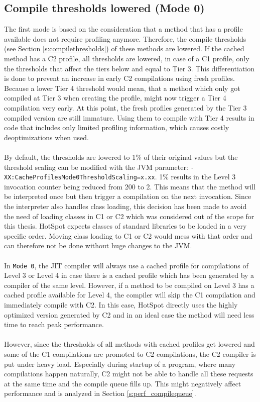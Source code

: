 \subsection{Compile thresholds lowered (Mode 0)}
\label{s:mode0}
The first mode is based on the consideration that a method that has a profile available does not require profiling anymore. Therefore, the compile thresholds (see Section \ref{s:compilethresholds}) of these methods are lowered. If the cached method has a C2 profile, all thresholds are lowered, in case of a C1 profile, only the thresholds that affect the tiers below and equal to Tier 3. This differentiation is done to prevent an increase in early C2 compilations using fresh profiles. Because a lower Tier 4 threshold would mean, that a method which only got compiled at Tier 3 when creating the profile, might now trigger a Tier 4 compilation very early. At this point, the fresh profiles generated by the Tier 3 compiled version are still immature. Using them to compile with Tier 4 results in code that includes only limited profiling information, which causes costly deoptimizations when used. 
\\\\
By default, the thresholds are lowered to 1\% of their original values but the threshold scaling can be modified with the JVM parameter: \texttt{-XX:CacheProfilesMode0ThresholdScaling=x.xx}. 1\% results in the Level 3 invocation counter being reduced from 200 to 2. This means that the method will be interpreted once but then trigger a compilation on the next invocation.
Since the interpreter also handles class loading, this decision has been made to avoid the need of loading classes in C1 or C2 which was considered out of the scope for this thesis. HotSpot expects classes of standard libraries to be loaded in a very specific order. Moving class loading to C1 or C2 would mess with that order and can therefore not be done without huge changes to the JVM.
\\\\
In \texttt{Mode 0}, the JIT compiler will always use a cached profile for compilations of Level 3 or Level 4 in case there is a cached profile which has been generated by a compiler of the same level. However, if a method to be compiled on Level 3 has a cached profile available for Level 4, the compiler will skip the C1 compilation and immediately compile with C2. In this case, HotSpot directly uses the highly optimized version generated by C2 and in an ideal case the method will need less time to reach peak performance.
\\\\
However, since the thresholds of all methods with cached profiles get lowered and some of the C1 compilations are promoted to C2 compilations, the C2 compiler is put under heavy load. Especially during startup of a program, where many compilations happen naturally, C2 might not be able to handle all these requests at the same time and the compile queue fills up. This might negatively affect performance and is analyzed in Section \ref{s:perf_compilequeue}.

